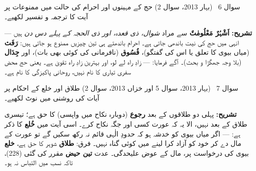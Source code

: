\begin{sawal}{سوال \textenglish{6} \ \textnormal{\small(بہار \textenglish{2013}، سوال \textenglish{2})}}
حج کے مہینوں اور احرام کی حالت میں ممنوعات پر آیت کا ترجمہ و تفسیر لکھیے۔
\end{sawal}

\begin{hal}

\medskip
\textbf{تشریح:} \textbf{اَشْہُرٌ مَعْلُومٰتٌ} سے مراد \emph{شوال، ذی قعدہ،
اور ذی الحجہ کے پہلے دس دن} ہیں --- انہی میں حج کی نیت باندھی جاتی ہے۔ احرام
باندھتے ہی تین چیزیں ممنوع ہو جاتی ہیں: \textbf{رَفَث} (میاں بیوی کا تعلق یا
اس کی گفتگو)، \textbf{فُسُوق} (نافرمانی کی کوئی بھی بات)، اور \textbf{جِدَال}
(بلا وجہ جھگڑا و بحث)۔ آگے فرمایا:  --- زادِ راہ لے لو، اور بہترین زادِ راہ تقویٰ ہے۔ یعنی حج محض
سفری تیاری کا نام نہیں، روحانی پاکیزگی کا نام ہے۔
\end{hal}

\begin{sawal}{سوال \textenglish{7} \ \textnormal{\small(بہار \textenglish{2013}، سوال \textenglish{5} اور خزاں \textenglish{2013}، سوال \textenglish{2})}}
طلاق اور خلع کے احکام پر آیات کی روشنی میں نوٹ لکھیے۔
\end{sawal}

\begin{hal}

\medskip
\textbf{تشریح:} پہلی دو طلاقوں کے بعد \textbf{رجوع} (دوبارہ نکاح میں واپسی)
کا حق ہے؛ تیسری طلاق کے بعد نہیں، الا یہ کہ عورت کسی اور جگہ نکاح کرے۔ اسی
آیت میں \textbf{خُلع} کا ذکر ہے:  --- اگر میاں بیوی کو
خدشہ ہو کہ حدودِ الٰہی قائم نہ رکھ سکیں گے تو عورت کے مال دے کر خود کو آزاد
کرا لینے میں کوئی گناہ نہیں۔ فرق: \textbf{طلاق} شوہر کا حق ہے، \textbf{خلع}
بیوی کی درخواست پر، مال کے عوض علیحدگی۔ عدت \textbf{تین حیض} مقرر کی گئی
(\textenglish{228})، تاکہ نسب میں التباس نہ ہو۔
\end{hal}

